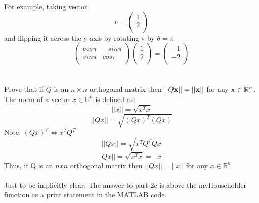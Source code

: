 \documentclass{article}
\begin{document}
For example, taking vector
\[
v = 
\begin{pmatrix}
1\\
2\\
\end{pmatrix}
\]
and flipping it across the y-axis by rotating v by $\theta = \pi$\\
\[
\begin{pmatrix}
cos\pi & -sin\pi\\
sin\pi & cos\pi\\
\end{pmatrix}
\begin{pmatrix}
1 \\
2 \\
\end{pmatrix}
=
\begin{pmatrix}
-1\\
-2\\
\end{pmatrix}
\]\\\\

 Prove that if $Q$ is an $n \times n$ orthogonal matrix then $||Q {\bf x}
|| = ||{\bf x}||$ for any ${\bf x} \in \mathbb{R}^n$. \\

\noindent The norm of a vector $x \in \mathbb{R}^n$ is defined as:
\[
||x|| = \sqrt{x^Tx}
\]
\[
||Qx|| = \sqrt{(Qx)^T(Qx)}
\]
Note: $(Qx)^T \Leftrightarrow x^TQ^T$
\[
||Qx|| = \sqrt{x^TQ^TQx}
\]
\[
||Qx|| = \sqrt{x^Tx} = ||x||
\]
Thus, if Q is an $nxn$ orthogonal matrix then $||Qx|| = ||x||$ for any $x \in \mathbb{R}^n$.\\\\

 Just to be implicitly clear: The answer to part 2c is above the myHouseholder function as a print statement in the MATLAB code.
\end{document}

